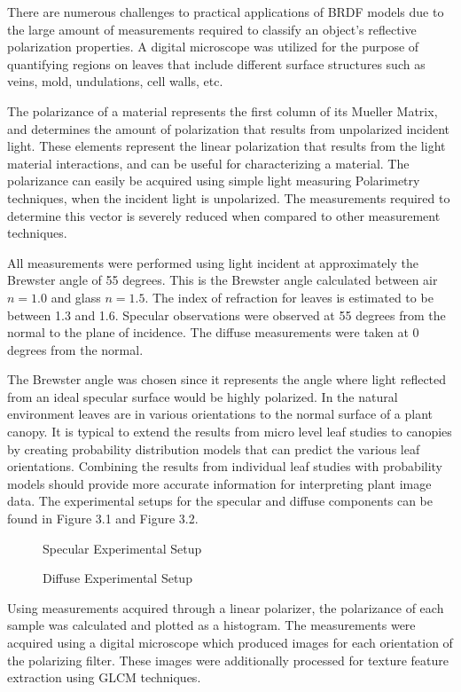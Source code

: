 There are numerous challenges to practical applications of BRDF models due to the large amount of measurements required to classify an object's reflective polarization properties.  A digital microscope was utilized for the purpose of quantifying regions on leaves that include different surface structures such as veins, mold, undulations, cell walls, etc.

The polarizance of a material represents the first column of its Mueller Matrix, and determines the amount of polarization that results from unpolarized incident light.  These elements represent the linear polarization that results from the light material interactions, and can be useful for characterizing a material.  The polarizance can easily be acquired using simple light measuring Polarimetry techniques, when the incident light is unpolarized.  The measurements required to determine this vector is severely reduced when compared to other measurement techniques.

All measurements were performed using light incident at approximately the Brewster angle of 55 degrees. This is the Brewster angle calculated between air $n=1.0$ and glass $n=1.5$.  The index of refraction for leaves is estimated to be between 1.3 and 1.6. Specular observations were observed at 55 degrees from the normal to the plane of incidence.  The diffuse measurements were taken at 0 degrees from the normal.

The Brewster angle was chosen since it represents the angle where light reflected from an ideal specular surface would be highly polarized.  In the natural environment leaves are in various orientations to the normal surface of a plant canopy.  It is typical to extend the results from micro level leaf studies to canopies by creating probability distribution models that can predict the various leaf orientations.  Combining the results from individual leaf studies with probability models should provide more accurate information for interpreting plant image data. The experimental setups for the specular and diffuse components can be found in  Figure 3.1 and Figure 3.2.
%
\begin{figure}[!htb]
    \begin{center}
    \end{center}
    \caption{Specular Experimental Setup}
    \label{fig:Experiment}
\end{figure}
\begin{figure}[!htb]
    \begin{center}
    \end{center}
    \caption{Diffuse Experimental Setup}
    \label{fig:Experiment}
\end{figure}
%
Using measurements acquired through a linear polarizer, the polarizance of each sample was calculated and plotted as a histogram.  The measurements were acquired using a digital microscope which produced images for each orientation of the polarizing filter.  These images were additionally processed for texture feature extraction using GLCM techniques.


